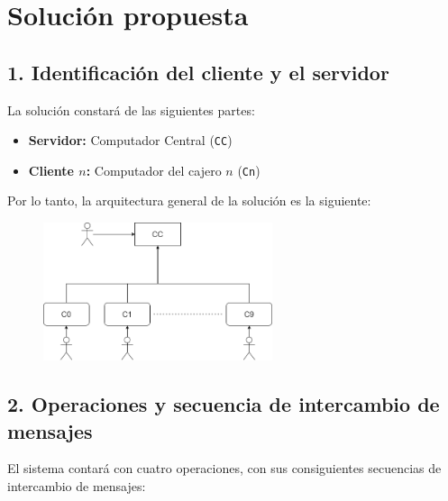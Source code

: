 
\section*{Solución propuesta}

\subsection*{1. Identificación del cliente y el servidor}
La solución constará de las siguientes partes:

\begin{itemize}
    \item \textbf{Servidor:} Computador Central (\texttt{CC})
    \item \textbf{Cliente $n$:} Computador del cajero $n$ (\texttt{Cn})
\end{itemize}

Por lo tanto, la arquitectura general de la solución es la siguiente:

\begin{figure}[h]
    \centering
    \includegraphics[width=0.6\textwidth]{img/arquitecture.png}
\end{figure}


\subsection*{2. Operaciones y secuencia de intercambio de mensajes}
El sistema contará con cuatro operaciones, con sus consiguientes secuencias de intercambio de mensajes:

